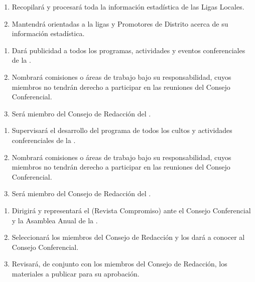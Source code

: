 \begin{enumerate}
    \item Recopilará y procesará toda la información estadística de las Ligas Locales.
    \item Mantendrá orientadas a la ligas y Promotores de Distrito acerca de su información estadística.
\end{enumerate}

\begin{enumerate}
    \item Dará publicidad a todos los programas, actividades y eventos conferenciales de la \LMJ{}.
    \item Nombrará comisiones o áreas de trabajo bajo su responsabilidad, cuyos miembros no tendrán derecho a participar en las reuniones del Consejo Conferencial.
    \item Será miembro del Consejo de Redacción del \OOLMJ{}.
\end{enumerate}

\begin{enumerate}
    \item Supervisará el desarrollo del programa de todos los cultos y actividades conferenciales de la \LMJ{}.
    \item Nombrará comisiones o áreas de trabajo bajo su responsabilidad, cuyos miembros no tendrán derecho a participar en las reuniones del Consejo Conferencial.
    \item Será miembro del Consejo de Redacción del \OOLMJ{}.
\end{enumerate}

\begin{enumerate}
    \item Dirigirá y representará el \OOLMJ{} (Revista Compromiso) ante el Consejo Conferencial y la Asamblea Anual de la \LMJ{}.
    \item Seleccionará los miembros del Consejo de Redacción y los dará a conocer al Consejo Conferencial.
    \item Revisará, de conjunto con los miembros del Consejo de Redacción, los materiales a publicar para su aprobación.
\end{enumerate}

